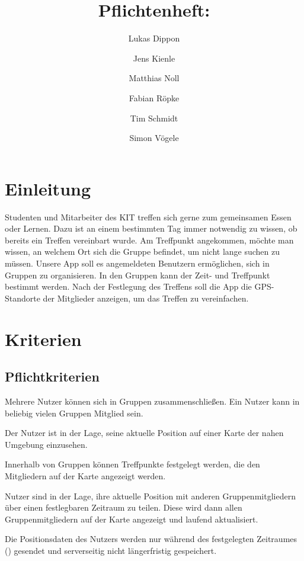 \documentclass[parskip=full,11pt]{scrartcl}
\title{Pflichtenheft: \producttitle}
\author{Lukas Dippon
        \and Jens Kienle
        \and Matthias Noll
        \and Fabian Röpke
        \and Tim Schmidt
        \and Simon Vögele}
\begin{document}
\maketitle

\section{Einleitung}
Studenten und Mitarbeiter des KIT treffen sich gerne zum gemeinsamen Essen oder Lernen.
Dazu ist an einem bestimmten Tag immer notwendig zu wissen, ob bereits ein Treffen vereinbart wurde.
Am Treffpunkt angekommen, möchte man wissen, an welchem Ort sich die Gruppe befindet, um nicht lange suchen zu müssen.
Unsere App soll es angemeldeten Benutzern ermöglichen, sich in Gruppen zu organisieren.
In den Gruppen kann der Zeit- und Treffpunkt bestimmt werden.
Nach der Festlegung des Treffens soll die App die GPS-Standorte der Mitglieder anzeigen, um das Treffen zu vereinfachen.

\pagebreak
\tableofcontents

\pagebreak
\section{Kriterien}

\subsection{Pflichtkriterien}
Mehrere Nutzer können sich in Gruppen zusammenschließen.
Ein Nutzer kann in beliebig vielen Gruppen Mitglied sein.

Der Nutzer ist in der Lage, seine aktuelle Position auf einer Karte der nahen
Umgebung einzusehen.

Innerhalb von Gruppen können Treffpunkte festgelegt werden,
die den Mitgliedern auf der Karte angezeigt werden.

Nutzer sind in der Lage, ihre aktuelle Position mit anderen Gruppenmitgliedern
über einen festlegbaren Zeitraum zu teilen.
Diese wird dann allen Gruppenmitgliedern auf der Karte angezeigt und laufend
aktualisiert.

Die Positionsdaten des Nutzers werden nur während des festgelegten Zeitraumes
() gesendet und serverseitig nicht
längerfristig gespeichert.
\end{document}
